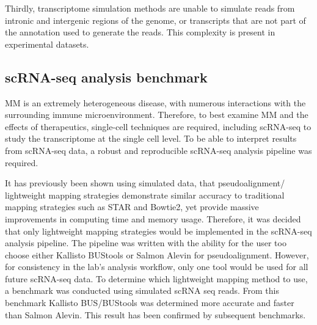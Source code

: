 Thirdly, transcriptome simulation methods are unable to simulate reads from intronic and intergenic regions of the genome, or transcripts that are not part of the annotation used to generate the reads.
This complexity is present in experimental datasets.


\subsection{scRNA-seq analysis benchmark}
MM is an extremely heterogeneous disease, with numerous interactions with the surrounding immune microenvironment.
Therefore, to best examine MM and the effects of therapeutics, single-cell techniques are required, including scRNA-seq to study the transcriptome at the single cell level.
To be able to interpret results from scRNA-seq data, a robust and reproducible scRNA-seq analysis pipeline was required.

It has previously been shown using simulated data, that pseudoalignment/ lightweight mapping strategies demonstrate similar accuracy to traditional mapping strategies such as STAR and Bowtie2, yet provide massive improvements in computing time and memory usage.
Therefore, it was decided that only lightweight mapping strategies would be implemented in the scRNA-seq analysis pipeline.
The pipeline was written with the ability for the user too choose either Kallisto BUStools or Salmon Alevin for pseudoalignment.
However, for consistency in the lab's analysis workflow, only one tool would be used for all future scRNA-seq data.
To determine which lightweight mapping method to use, a benchmark was conducted using simulated scRNA seq reads.
From this benchmark Kallisto BUS/BUStools was determined more accurate and faster than Salmon Alevin.
This result has been confirmed by subsequent benchmarks\cite{you2021benchmarking, melsted2019modular, melsted2019barcode}.

